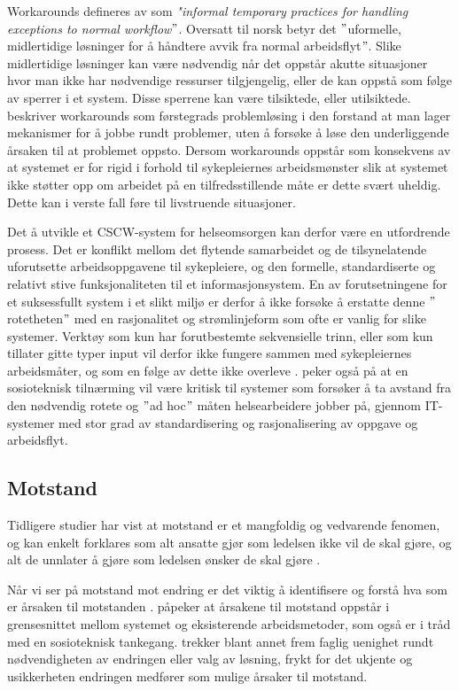 \noindent
Workarounds defineres av \citet{Kobayashi05} som \emph{"informal temporary practices for handling exceptions to normal workflow$"$}. Oversatt til norsk betyr det $"$uformelle, midlertidige løsninger for å håndtere avvik fra normal arbeidsflyt$"$. Slike midlertidige løsninger kan være nødvendig når det oppstår akutte situasjoner hvor man ikke har nødvendige ressurser tilgjengelig, eller de kan oppstå som følge av sperrer i et system. Disse sperrene kan være tilsiktede, eller utilsiktede. \citet{Vogelsmeier08} beskriver workarounds som førstegrads problemløsing i den forstand at man lager mekanismer for å jobbe rundt problemer, uten å forsøke å løse den underliggende årsaken til at problemet oppsto. Dersom workarounds oppstår som konsekvens av at systemet er for rigid i forhold til sykepleiernes arbeidsmønster slik at systemet ikke støtter opp om arbeidet på en tilfredsstillende måte er dette svært uheldig. Dette kan i verste fall føre til livstruende situasjoner.

\noindent
Det å utvikle et CSCW-system for helseomsorgen kan derfor være en utfordrende prosess. Det er konflikt mellom det flytende samarbeidet og de tilsynelatende uforutsette arbeidsoppgavene til sykepleiere, og den formelle, standardiserte og relativt stive funksjonaliteten til et informasjonsystem. En av forutsetningene for et suksessfullt system i et slikt miljø er derfor å ikke forsøke å erstatte denne $"$rotetheten$"$ med en rasjonalitet og strømlinjeform som ofte er vanlig for slike systemer. Verktøy som kun har forutbestemte sekvensielle trinn, eller som kun tillater gitte typer input vil derfor ikke fungere sammen med sykepleiernes arbeidsmåter, og som en følge av dette ikke overleve \citep{Berg99}. \citet{Berg99} peker også på at en sosioteknisk tilnærming vil være kritisk til systemer som forsøker å ta avstand fra den nødvendig rotete og $"$ad hoc$"$ måten helsearbeidere jobber på, gjennom IT-systemer med stor grad av standardisering og rasjonalisering av oppgave og arbeidsflyt.

\subsection{Motstand}
\label{sec:motstand}
Tidligere studier har vist at motstand er et mangfoldig og vedvarende fenomen, og kan enkelt forklares som alt ansatte gjør som ledelsen ikke vil de skal gjøre, og alt de unnlater å gjøre som ledelsen ønsker de skal gjøre \citep{Timmons03}.
 
\noindent
Når vi ser på motstand mot endring er det viktig å identifisere og forstå hva som er årsaken til motstanden \citep{Lapointe05}. \citet{Timmons03} påpeker at årsakene til motstand oppstår i grensesnittet mellom systemet og eksisterende arbeidsmetoder, som også er i tråd med en sosioteknisk tankegang. \citet{Jacobsen12} trekker blant annet frem faglig uenighet rundt nødvendigheten av endringen eller valg av løsning, frykt for det ukjente og usikkerheten endringen medfører som mulige årsaker til motstand.
 
